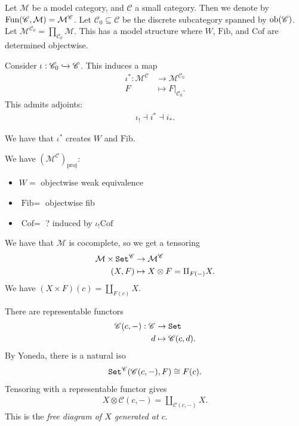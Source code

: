\documentclass[12pt]{amsart}
\theoremstyle{definition}
\providecommand{\Cof}{\text{Cof}}
\providecommand{\Fib}{\text{Fib}}
\begin{document}
Let $\mathcal{M}$ be a model category, and $\mathscr{C}$ a small category. Then we denote by $\text{Fun}(\mathscr{C},\mathcal{M}) = \mathcal{M}^{\mathscr{C}}$. Let $\mathscr{C}_0 \subseteq \mathscr{C}$ be the discrete subcategory spanned by $\text{ob}(\mathscr{C})$. Let $\mathcal{M}^{\mathscr{C}_0} = \prod_{\mathscr{C}_0} \mathcal{M}$. This has a model structure where $W$, $\Fib$, and $\Cof$ are determined objectwise.

Consider $\iota: \mathscr{C}_0 \xhookrightarrow{} \mathscr{C}$. This induces a map
\begin{align*}
    \iota^\ast: \mathcal{M}^{\mathscr{C}} &\to \mathcal{M}^{\mathscr{C}_0} \\
    F &\mapsto \left. F \right|_{ \mathscr{C}_0 }.
\end{align*}
This admits adjoints:
\begin{align*}
    \iota_! \dashv i^\ast \dashv i_\ast.
\end{align*}

We have that $\iota^\ast$ creates $W$ and $\Fib$.

We have $\left( \mathcal{M}^{\mathscr{C}} \right)_\text{proj}$:
\begin{itemize}
    \item $W=$ objectwise weak equivalence
    \item $\Fib=$ objectwise fib
    \item $\Cof=$ ? induced by $\iota_! \Cof$
\end{itemize}

We have that $\mathcal{M}$ is cocomplete, so we get a tensoring
\begin{align*}
    \mathcal{M} \times \texttt{Set}^{\mathscr{C}} &\to \mathcal{M}^{\mathscr{C}} \\
    (X,F) &\mapsto X \otimes F = \amalg_{F(-)} X.
\end{align*}
We have $(X \times F)(c) = \amalg_{F(c)} X$.

There are representable functors
\begin{align*}
    \mathscr{C}(c,-) : \mathscr{C} &\to \texttt{Set} \\
    d &\mapsto \mathscr{C}(c,d).
\end{align*}
By Yoneda, there is a natural iso
\begin{align*}
    \texttt{Set}^{\mathscr{C}}(\mathscr{C}(c,-),F) \cong F(c).
\end{align*}
Tensoring with a representable functor gives
\begin{align*}
    X \otimes \mathscr{C}(c,-) = \amalg_{\mathscr{C}(c,-)} X.
\end{align*}
This is the \textit{free diagram of $X$ generated at $c$}.
\end{document}
